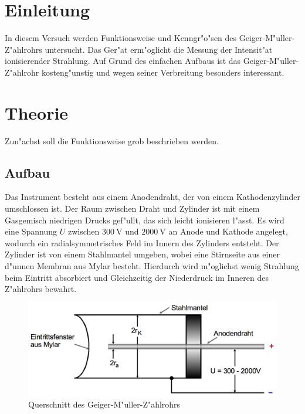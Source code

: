 \section{Einleitung} %
\label{sec:einleitung}
	In diesem Versuch werden Funktionsweise und Kenngr"o"sen des Geiger-M"uller-Z"ahlrohrs untersucht.
	Das Ger"at erm"oglicht die Messung der Intensit"at ionisierender Strahlung.
	Auf Grund des einfachen Aufbaus ist das Geiger-M"uller-Z"ahlrohr kosteng"unstig und wegen seiner Verbreitung besonders interessant.

\section{Theorie} %
\label{sec:theorie}
	Zun"achst soll die Funktionsweise grob beschrieben werden.

	\subsection{Aufbau}
	\label{subsec:aufbau}
		Das Instrument besteht aus einem Anodendraht, der von einem Kathodenzylinder umschlossen ist.
		Der Raum zwischen Draht und Zylinder ist mit einem Gasgemisch niedrigen Drucks gef"ullt, das sich leicht ionisieren l"asst.
		Es wird eine Spannung $U$ zwischen $\SI{300}{\volt}$ und $\SI{2000}{\volt}$ an Anode und Kathode angelegt, wodurch ein radialsymmetrisches Feld im Innern des Zylinders entsteht.
		Der Zylinder ist von einem Stahlmantel umgeben, wobei eine Stirnseite aus einer d"unnen Membran aus Mylar besteht.
		Hierdurch wird m"oglichst wenig Strahlung beim Eintritt absorbiert und Gleichzeitig der Niederdruck im Inneren des Z"ahlrohrs bewahrt.

		\begin{figure}[h]
			\centering
			\includegraphics[width = 15cm]{img/zaehlrohr.jpeg}
			\caption{Querschnitt des Geiger-M"uller-Z"ahlrohrs \cite{anleitung}}
			\label{fig:querschnitt}
		\end{figure}

